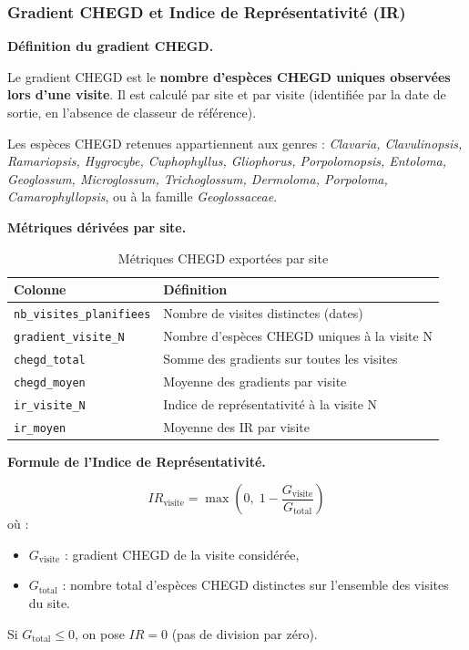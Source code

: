 \documentclass[11pt,a4paper]{article}
\begin{document}
\subsubsection{Gradient CHEGD et Indice de Représentativité (IR)}

\medskip
\noindent\textbf{Définition du gradient CHEGD.}\par

Le gradient CHEGD est le \textbf{nombre d'espèces CHEGD uniques observées lors d'une visite}.
Il est calculé par site et par visite (identifiée par la date de sortie, en l'absence de
classeur de référence).

Les espèces CHEGD retenues appartiennent aux genres :
\textit{Clavaria, Clavulinopsis, Ramariopsis, Hygrocybe, Cuphophyllus, Gliophorus,
Porpolomopsis, Entoloma, Geoglossum, Microglossum, Trichoglossum, Dermoloma, Porpoloma,
Camarophyllopsis}, ou à la famille \textit{Geoglossaceae}.

\medskip
\noindent\textbf{Métriques dérivées par site.}\par

\begin{table}[htbp]
  \centering
  \caption{Métriques CHEGD exportées par site}
  \begin{tabularx}{\textwidth}{lX}
    \toprule
    \textbf{Colonne} & \textbf{Définition} \\
    \midrule
    \texttt{nb\_visites\_planifiees} & Nombre de visites distinctes (dates) \\
    \texttt{gradient\_visite\_N}     & Nombre d'espèces CHEGD uniques à la visite N \\
    \texttt{chegd\_total}            & Somme des gradients sur toutes les visites \\
    \texttt{chegd\_moyen}            & Moyenne des gradients par visite \\
    \texttt{ir\_visite\_N}           & Indice de représentativité à la visite N \\
    \texttt{ir\_moyen}               & Moyenne des IR par visite \\
    \bottomrule
  \end{tabularx}
\end{table}

\medskip
\noindent\textbf{Formule de l'Indice de Représentativité.}\par

\begin{formulebox}
  \[
    IR_{\text{visite}} = \max\!\left(0,\; 1 - \frac{G_{\text{visite}}}{G_{\text{total}}}\right)
  \]
  où :
  \begin{itemize}
    \item $G_{\text{visite}}$ : gradient CHEGD de la visite considérée,
    \item $G_{\text{total}}$ : nombre total d'espèces CHEGD distinctes sur l'ensemble des visites du site.
  \end{itemize}
  Si $G_{\text{total}} \leq 0$, on pose $IR = 0$ (pas de division par zéro).
\end{formulebox}
\end{document}
